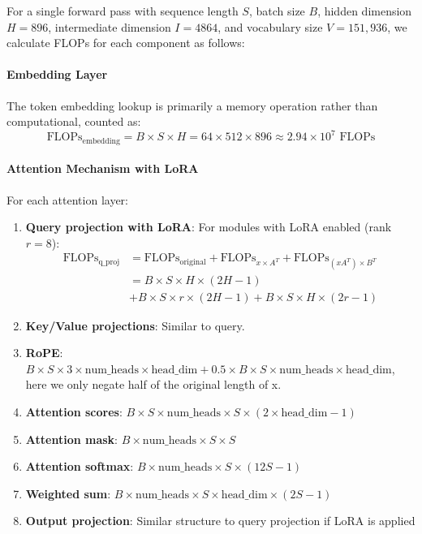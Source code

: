 \documentclass{article}
\begin{document}
For a single forward pass with sequence length $S$, batch size $B$, hidden dimension $H=896$, intermediate dimension $I=4864$, and vocabulary size $V=151,936$, we calculate FLOPs for each component as follows:

\paragraph{Embedding Layer}
The token embedding lookup is primarily a memory operation rather than computational, counted as:
\begin{equation}
\text{FLOPs}_{\text{embedding}} = B \times S \times H = 64 \times 512 \times 896 \approx 2.94 \times 10^7 \text{ FLOPs}
\end{equation}

\paragraph{Attention Mechanism with LoRA}
For each attention layer:
\begin{enumerate}
    \item \textbf{Query projection with LoRA}: For modules with LoRA enabled (rank $r=8$):
    \begin{align}
    \text{FLOPs}_{\text{q\_proj}} &= \text{FLOPs}_{\text{original}} + \text{FLOPs}_{x \times A^T} + \text{FLOPs}_{(xA^T) \times B^T}\\
    &= B\times S \times H \times (2H-1) \\
    &+ B\times S \times r \times (2H-1) + B\times S \times H \times (2r-1)
    \end{align}
    
    \item \textbf{Key/Value projections}: Similar to query.
    \item \textbf{RoPE}: $B\times S \times 3 \times \text{num\_heads} \times \text{head\_dim} + 0.5 \times B \times S \times \text{num\_heads} \times \text{head\_dim}$, here we only negate half of the original length of x.
    \item \textbf{Attention scores}: $B\times S \times \text{num\_heads} \times S \times (2 \times \text{head\_dim} - 1)$
    \item \textbf{Attention mask}: $B \times \text{num\_heads} \times S \times S$
    \item \textbf{Attention softmax}: $B \times \text{num\_heads} \times S \times (12S - 1)$
    \item \textbf{Weighted sum}: $B \times \text{num\_heads} \times S \times \text{head\_dim} \times (2S - 1)$
    \item \textbf{Output projection}: Similar structure to query projection if LoRA is applied
\end{enumerate}
\end{document}
